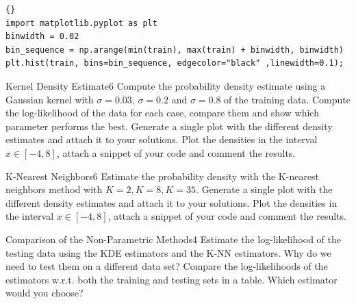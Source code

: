 \begin{questions}
\begin{lstlisting}{}
import matplotlib.pyplot as plt
binwidth = 0.02
bin_sequence = np.arange(min(train), max(train) + binwidth, binwidth)  
plt.hist(train, bins=bin_sequence, edgecolor="black" ,linewidth=0.1);
\end{lstlisting}


\begin{question}{Kernel Density Estimate}{6}
Compute the probability density estimate using a Gaussian kernel with $\sigma=0.03$, $\sigma=0.2$ and $\sigma=0.8$ of the training data. Compute the log-likelihood of the data for each case, compare them and show which parameter performs the best.
Generate a single plot with the different density estimates and attach it to your solutions. Plot the densities in the interval $x \in [-4,8]$, attach a snippet of your code and comment the results.

\begin{answer}\end{answer}

\end{question}


\begin{question}{K-Nearest Neighbors}{6}
Estimate the probability density with the K-nearest neighbors method with $K=2, K=8, K=35$.
Generate a single plot with the different density estimates and attach it to your solutions. Plot the densities in the interval $x \in [-4,8]$, attach a snippet of your code and comment the results.

\begin{answer}\end{answer}

\end{question}


\begin{question}{Comparison of the Non-Parametric Methods}{4}
Estimate the log-likelihood of the testing data using the KDE estimators and the K-NN estimators.
Why do we need to test them on a different data set? Compare the log-likelihoods of the estimators w.r.t. both the training and testing sets in a table. Which estimator would you choose?

\begin{answer}\end{answer}

\end{question}

\end{questions}
